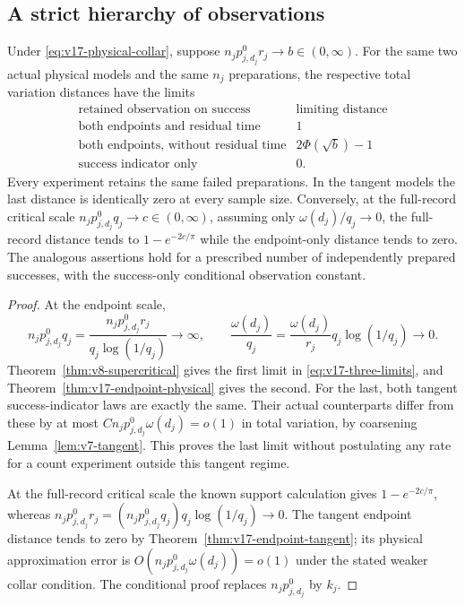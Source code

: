 \subsection{A strict hierarchy of observations}
\begin{corollary}
\label{cor:v17-coarsening-hierarchy}
Under \eqref{eq:v17-physical-collar}, suppose
$n_jp_{j,d_j}^0r_j\to b\in(0,\infty)$. For the same two actual
physical models and the same $n_j$ preparations, the respective total
variation distances have the limits
\begin{equation}\label{eq:v17-three-limits}
 \begin{array}{c|c}
 \text{retained observation on success}&\text{limiting distance}\\ \hline
 \text{both endpoints and residual time}&1\\
 \text{both endpoints, without residual time}&2\Phi(\sqrt b)-1\\
 \text{success indicator only}&0.
 \end{array}
\end{equation}
Every experiment retains the same failed preparations. In the tangent
models the last distance is identically zero at every sample size.
Conversely, at the full-record critical scale
$n_jp_{j,d_j}^0q_j\to c\in(0,\infty)$, assuming only
$\omega(d_j)/q_j\to0$, the full-record distance tends to
$1-e^{-2c/\pi}$ while the endpoint-only distance tends to zero.
The analogous assertions hold for a prescribed number of independently
prepared successes, with the success-only conditional observation
constant.
\end{corollary}
\begin{proof}
At the endpoint scale,
\[
 n_jp_{j,d_j}^0q_j
       =\frac{n_jp_{j,d_j}^0r_j}{q_j\log(1/q_j)}\longrightarrow\infty,
 \qquad \frac{\omega(d_j)}{q_j}
       =\frac{\omega(d_j)}{r_j}q_j\log(1/q_j)\longrightarrow0.
\]
Theorem~\ref{thm:v8-supercritical} gives the first limit in
\eqref{eq:v17-three-limits}, and
Theorem~\ref{thm:v17-endpoint-physical} gives the second.
For the last, both tangent success-indicator laws are exactly the same.
Their actual counterparts differ from these by at most
$Cn_jp_{j,d_j}^0\omega(d_j)=o(1)$ in total variation, by coarsening
Lemma~\ref{lem:v7-tangent}. This proves the last limit without
postulating any rate for a count experiment outside this tangent regime.

At the full-record critical scale the known support calculation gives
$1-e^{-2c/\pi}$, whereas
$n_jp_{j,d_j}^0r_j=(n_jp_{j,d_j}^0q_j)q_j\log(1/q_j)\to0$.
The tangent endpoint distance tends to zero by
Theorem~\ref{thm:v17-endpoint-tangent}; its physical approximation error
is $O(n_jp_{j,d_j}^0\omega(d_j))=o(1)$ under the stated weaker collar
condition. The conditional proof replaces $n_jp_{j,d_j}^0$ by $k_j$.
\end{proof}

